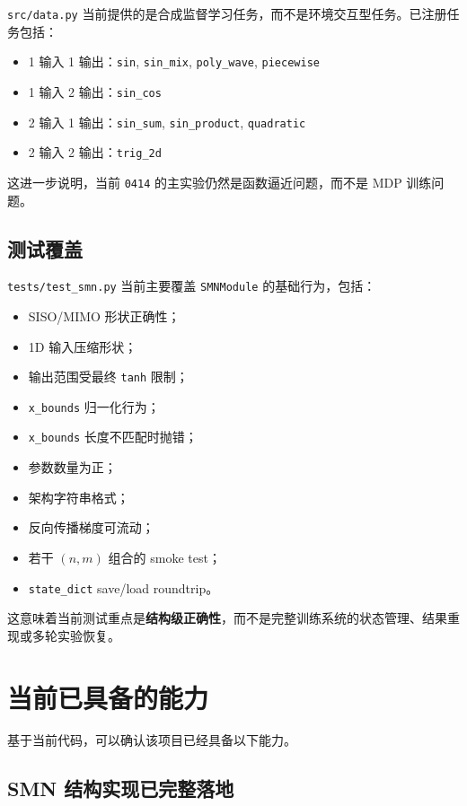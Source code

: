 \documentclass[11pt,fontset=none]{ctexart}
\begin{document}
\texttt{src/data.py} 当前提供的是合成监督学习任务，而不是环境交互型任务。已注册任务包括：
\begin{itemize}[leftmargin=2em]
  \item 1 输入 1 输出：\texttt{sin}, \texttt{sin\_mix}, \texttt{poly\_wave}, \texttt{piecewise}
  \item 1 输入 2 输出：\texttt{sin\_cos}
  \item 2 输入 1 输出：\texttt{sin\_sum}, \texttt{sin\_product}, \texttt{quadratic}
  \item 2 输入 2 输出：\texttt{trig\_2d}
\end{itemize}

这进一步说明，当前 \texttt{0414} 的主实验仍然是函数逼近问题，而不是 MDP 训练问题。

\subsection{测试覆盖}

\texttt{tests/test\_smn.py} 当前主要覆盖 \texttt{SMNModule} 的基础行为，包括：
\begin{itemize}[leftmargin=2em]
  \item SISO/MIMO 形状正确性；
  \item 1D 输入压缩形状；
  \item 输出范围受最终 \texttt{tanh} 限制；
  \item \texttt{x\_bounds} 归一化行为；
  \item \texttt{x\_bounds} 长度不匹配时抛错；
  \item 参数数量为正；
  \item 架构字符串格式；
  \item 反向传播梯度可流动；
  \item 若干 \((n,m)\) 组合的 smoke test；
  \item \texttt{state\_dict} save/load roundtrip。
\end{itemize}

这意味着当前测试重点是\textbf{结构级正确性}，而不是完整训练系统的状态管理、结果重现或多轮实验恢复。

\section{当前已具备的能力}

基于当前代码，可以确认该项目已经具备以下能力。

\subsection{SMN 结构实现已完整落地}
\end{document}
